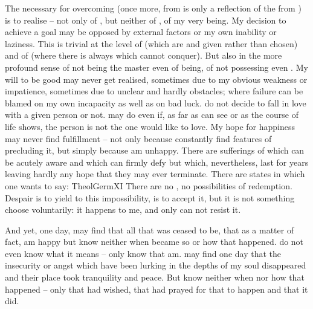 \pa The  necessary for overcoming  (once more,
 from  is only a reflection of the 
from ) is to realise  -- not only of
, but neither of , of my very being.  My decision to
achieve a goal may be opposed by external factors or my own inability or
laziness.  This is trivial at the level of  (which are 
and given rather than chosen) and of  (where there is always
 which  cannot conquer).  But  also in
the more profound sense of not being the master even of  being, of not
possessing even .  My will to be good may never get realised,
sometimes due to my obvious weakness or impatience, sometimes due to unclear and
hardly  obstacles; where failure can be blamed on my own incapacity
as well as on bad luck.   do not decide to fall in love with a given
person or not.   may do even if, as far as  can see or as the course
of life shows, the person is not the one  would like to love.  My hope for
happiness may never find fulfillment -- not only because  constantly find
features of  precluding it, but simply because  am unhappy.
There are sufferings of which  can be acutely aware and which  can
firmly defy but which, nevertheless, last for years leaving hardly any hope that
they may ever terminate.  There are states in which one wants to say: \citet{Let
  me perish, let me die!  I live without hope; from within and from without I am
  condemned, let no one pray that I may be released!}{TheolGerm}{XI} There are
no , no  possibilities of redemption.  Despair is to yield
to this impossibility, is to accept it, but it is not something  choose
voluntarily: it happens to me, and  only can not resist it.

And yet, one day,  may find that all that was ceased to be, that as a
matter of fact,  am happy but  know neither when  became so or
how that happened.   do not even know what it means --  only know
that  am.   may find one day that the insecurity or angst which have
been lurking in the depths of my soul disappeared and their place took
tranquility and peace.  But  know neither when nor how that happened --
only that  had wished, that  had prayed for that to happen and that
it did.  

